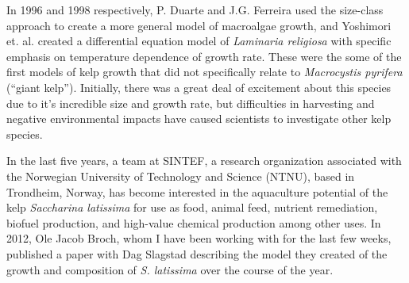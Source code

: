 \documentclass[10pt]{article}
\begin{document}
In 1996 and 1998 respectively, P. Duarte and J.G. Ferreira used the size-class approach to create a more general model of macroalgae growth, and Yoshimori et. al. created a differential equation model of \textit{Laminaria religiosa} with specific emphasis on temperature dependence of growth rate. These were the some of the first models of kelp growth that did not specifically relate to \textit{Macrocystis pyrifera} (``giant kelp''). Initially, there was a great deal of excitement about this species due to it's incredible size and growth rate, but difficulties in harvesting and negative environmental impacts have caused scientists to investigate other kelp species.

In the last five years, a team at SINTEF, a research organization associated with the Norwegian University of Technology and Science (NTNU), based in Trondheim, Norway, has become interested in the aquaculture potential of the kelp \textit{Saccharina latissima} for use as food, animal feed, nutrient remediation, biofuel production, and high-value chemical production among other uses. In 2012, Ole Jacob Broch, whom I have been working with for the last few weeks, published a paper with Dag Slagstad describing the model they created of the growth and composition of \textit{S. latissima} over the course of the year. \cite{broch_modelling_2012}
\end{document}
